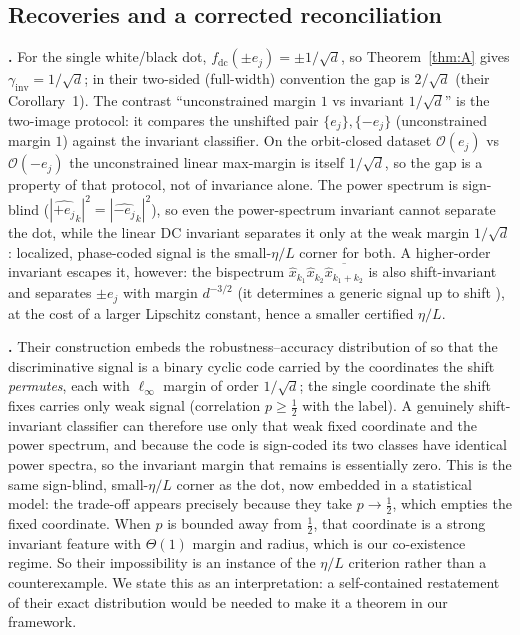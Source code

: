 \documentclass{article}
\theoremstyle{definition}
\newcommand{\fdc}{f_{\mathrm{dc}}}
\newcommand{\dd}{d}
\begin{document}
\subsection{Recoveries and a corrected reconciliation}\label{sec:recover}
\textbf{\citet{ge2021shift}.} For the single white/black dot, $\fdc(\pm e_j)=\pm1/\sqrt\dd$, so Theorem~\ref{thm:A} gives $\gamma_{\mathrm{inv}}=1/\sqrt\dd$; in their two-sided (full-width) convention the gap is $2/\sqrt\dd$ (their Corollary~1). The contrast ``unconstrained margin $1$ vs invariant $1/\sqrt\dd$'' is the two-image protocol: it compares the unshifted pair $\{e_j\},\{-e_j\}$ (unconstrained margin $1$) against the invariant classifier. On the orbit-closed dataset $\mathcal O(e_j)$ vs $\mathcal O(-e_j)$ the unconstrained linear max-margin is itself $1/\sqrt\dd$, so the gap is a property of that protocol, not of invariance alone. The power spectrum is sign-blind ($|\widehat{+e_j}_k|^2=|\widehat{-e_j}_k|^2$), so even the power-spectrum invariant cannot separate the dot, while the linear DC invariant separates it only at the weak margin $1/\sqrt\dd$: localized, phase-coded signal is the small-$\eta/L$ corner for both. A higher-order invariant escapes it, however: the bispectrum $\hat x_{k_1}\hat x_{k_2}\overline{\hat x_{k_1+k_2}}$ is also shift-invariant and separates $\pm e_j$ with margin $d^{-3/2}$ (it determines a generic signal up to shift \citep{kakarala2012bispectrum}), at the cost of a larger Lipschitz constant, hence a smaller certified $\eta/L$.

\textbf{\citet{kamath2021canwehaveitall}.} Their construction embeds the robustness--accuracy distribution of \citet{tsipras2019robustness} so that the discriminative signal is a binary cyclic code carried by the coordinates the shift \emph{permutes}, each with $\ell_\infty$ margin of order $1/\sqrt\dd$; the single coordinate the shift fixes carries only weak signal (correlation $p\ge\tfrac12$ with the label). A genuinely shift-invariant classifier can therefore use only that weak fixed coordinate and the power spectrum, and because the code is sign-coded its two classes have identical power spectra, so the invariant margin that remains is essentially zero. This is the same sign-blind, small-$\eta/L$ corner as the \citet{ge2021shift} dot, now embedded in a statistical model: the trade-off appears precisely because they take $p\to\tfrac12$, which empties the fixed coordinate. When $p$ is bounded away from $\tfrac12$, that coordinate is a strong invariant feature with $\Theta(1)$ margin and radius, which is our co-existence regime. So their impossibility is an instance of the $\eta/L$ criterion rather than a counterexample. We state this as an interpretation: a self-contained restatement of their exact distribution would be needed to make it a theorem in our framework.
\end{document}
